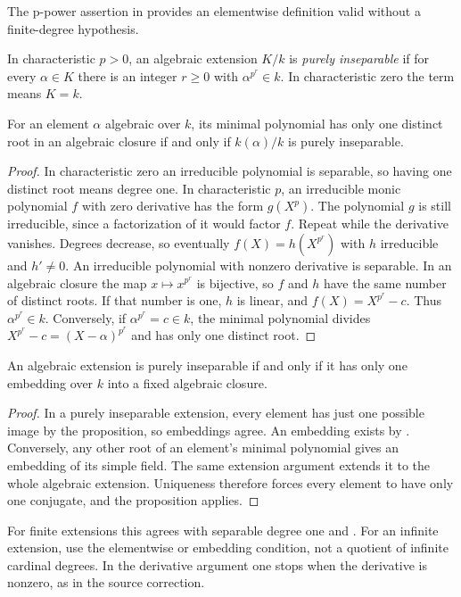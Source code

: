 The p-power assertion in 
provides an elementwise definition valid without a finite-degree hypothesis.

\begin{definition}\label{purely-inseparable-algebraic-extension}
In characteristic $p>0$, an algebraic extension $K/k$ is
\emph{purely inseparable} if for every $\alpha\in K$ there is an
integer $r\ge0$ with $\alpha^{p^r}\in k$.
In characteristic zero the term means $K=k$.
\end{definition}
\begin{proposition}\label{unique-conjugate-criterion}
For an element $\alpha$ algebraic over $k$, its minimal polynomial
has only one distinct root in an algebraic closure if and only if
$k(\alpha)/k$ is purely inseparable.
\end{proposition}
\begin{proof}\label{unique-conjugate-criterion-proof}
In characteristic zero an irreducible polynomial is separable, so
having one distinct root means degree one.
In characteristic $p$, an irreducible monic polynomial $f$ with
zero derivative has the form $g(X^p)$. The polynomial $g$ is still
irreducible, since a factorization of it would factor $f$.
Repeat while the derivative vanishes. Degrees decrease, so eventually
$f(X)=h(X^{p^r})$ with $h$ irreducible and $h'\ne0$.
An irreducible polynomial with nonzero derivative is separable.
In an algebraic closure the map $x\mapsto x^{p^r}$ is bijective,
so $f$ and $h$ have the same number of distinct roots.
If that number is one, $h$ is linear, and $f(X)=X^{p^r}-c$.
Thus $\alpha^{p^r}\in k$.
Conversely, if $\alpha^{p^r}=c\in k$, the minimal polynomial divides
$X^{p^r}-c=(X-\alpha)^{p^r}$ and has only one distinct root.
\end{proof}
\begin{corollary}\label{purely-inseparable-embeddings}
An algebraic extension is purely inseparable if and only if it has
only one embedding over $k$ into a fixed algebraic closure.
\end{corollary}
\begin{proof}\label{purely-inseparable-embeddings-proof}
In a purely inseparable extension, every element has just one possible
image by the proposition, so embeddings agree. An embedding exists
by .
Conversely, any other root of an element's minimal polynomial gives
an embedding of its simple field. The same extension argument extends
it to the whole algebraic extension. Uniqueness therefore forces
every element to have only one conjugate, and the proposition applies.
\end{proof}
\begin{remark}\label{inseparable-degree-scope}
For finite extensions this agrees with separable degree one and
.
For an infinite extension, use the elementwise or embedding condition,
not a quotient of infinite cardinal degrees. In the derivative
argument one stops when the derivative is nonzero, as in the source correction.
\end{remark}
